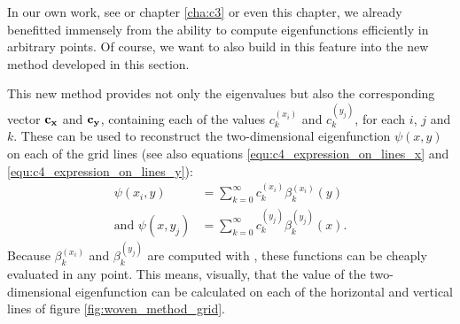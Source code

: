 In our own work, see \cite{baeyens_improvements_2022} or chapter \ref{cha:c3} or even this chapter, we already benefitted immensely from the ability to compute eigenfunctions efficiently in arbitrary points. Of course, we want to also build in this feature into the new method developed in this section.

This new method provides not only the eigenvalues but also the corresponding vector $\vb{c_x}$ and $\vb{c_y}$, containing each of the values $c_k^{(x_i)}$ and $c_k^{(y_j)}$, for each $i$, $j$ and $k$. These can be used to reconstruct the two-dimensional eigenfunction $\psi(x, y)$ on each of the grid lines (see also equations \eqref{equ:c4_expression_on_lines_x} and \eqref{equ:c4_expression_on_lines_y}):
\begin{align*}
    \psi(x_i, y)             & = \sum_{k=0}^\infty c_k^{(x_i)} \beta_k^{(x_i)}(y)          \\
    \text{and } \psi(x, y_j) & = \sum_{k=0}^\infty c_k^{(y_j)} \beta_k^{(y_j)}(x) \text{.}
\end{align*}
Because $\beta_k^{(x_i)}$ and $\beta_k^{(y_j)}$ are computed with , these functions can be cheaply evaluated in any point. This means, visually, that the value of the two-dimensional eigenfunction can be calculated on each of the horizontal and vertical lines of figure \ref{fig:woven_method_grid}.

